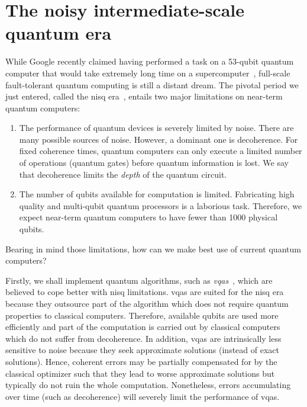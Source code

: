 \section{The noisy intermediate-scale quantum era}
While Google recently claimed having performed a task on a 53-qubit quantum computer that would take extremely long time on a supercomputer~\cite{Arute2019QuantumProcessor}, full-scale fault-tolerant quantum computing is still a distant dream. The pivotal period we just entered, called the \gls{nisq} era~\cite{Preskill2018QuantumBeyond}, entails two major limitations on near-term quantum computers:
\begin{enumerate}
    \item The performance of quantum devices is severely limited by noise. There are many possible sources of noise. However, a dominant one is decoherence. For fixed coherence times, quantum computers can only execute a limited number of operations (quantum gates) before quantum information is lost. We say that decoherence limits the \textit{depth} of the quantum circuit.
    \item The number of qubits available for computation is limited. Fabricating high quality and multi-qubit quantum processors is a laborious task. Therefore, we expect near-term quantum computers to have fewer than 1000 physical qubits.
\end{enumerate} 

Bearing in mind those limitations, how can we make best use of current quantum computers? 

Firstly, we shall implement quantum algorithms, such as \textit{\glspl{vqa}}~\cite{Moll2017QuantumDevices}, which are believed to cope better with \gls{nisq} limitations. \Glspl{vqa} are suited for the \gls{nisq} era because they outsource part of the algorithm which does not require quantum properties to classical computers. Therefore, available qubits are used more efficiently and part of the computation is carried out by classical computers which do not suffer from decoherence. In addition, \glspl{vqa} are intrinsically less sensitive to noise because they seek approximate solutions (instead of exact solutions). Hence, coherent errors may be partially compensated for by the classical optimizer such that they lead to worse approximate solutions but typically do not ruin the whole computation. Nonetheless, errors accumulating over time (such as decoherence) will severely limit the performance of \glspl{vqa}.

